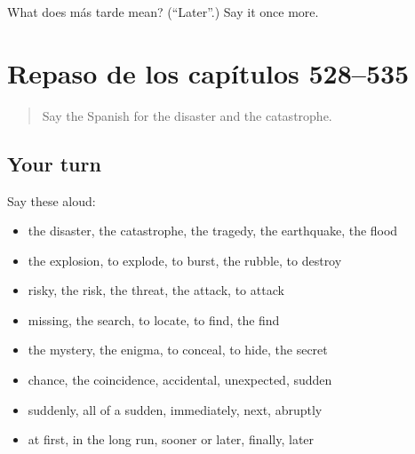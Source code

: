 \begin{tcolorbox}[breakable,colback=teal!4,colframe=teal!35!black,title={Before you move on}]
What does más tarde mean? (\textquotedblleft{}Later\textquotedblright{}.) Say it once more.
\end{tcolorbox}
\section[(dialogue)]{Repaso de los capítulos 528–535}

\label{lesson:ES-R535-repaso-528-535}



\begin{quote}
Say the Spanish for the disaster and the catastrophe.
\end{quote}

\subsection*{Your turn}
Say these aloud:

\begin{itemize}
\raggedright
  \item the disaster, the catastrophe, the tragedy, the earthquake, the flood
  \item the explosion, to explode, to burst, the rubble, to destroy
  \item risky, the risk, the threat, the attack, to attack
  \item missing, the search, to locate, to find, the find
  \item the mystery, the enigma, to conceal, to hide, the secret
  \item chance, the coincidence, accidental, unexpected, sudden
  \item suddenly, all of a sudden, immediately, next, abruptly
  \item at first, in the long run, sooner or later, finally, later
\end{itemize}

